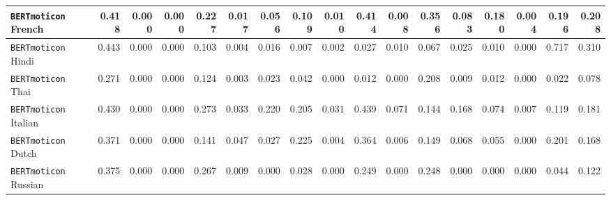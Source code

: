 \documentclass[a4paper, 11pt]{standalone}
\begin{document}
{\begin{tabular}{ l|r r r r r r r r r r r r r r r|r }
 \\
 \hline
\texttt{BERTmoticon}  French &
0.418 &
0.000 &
0.000 &
0.227 &
0.017 &
0.056 &
0.109 &
0.010 &
0.414 &
0.008 &
0.356 &
0.083 &
0.180 &
0.004 &
0.196 &
0.208
 \\
 \hline
\texttt{BERTmoticon}  Hindi &
0.443 &
0.000 &
0.000 &
0.103 &
0.004 &
0.016 &
0.007 &
0.002 &
0.027 &
0.010 &
0.067 &
0.025 &
0.010 &
0.000 &
0.717 &
0.310
 \\
 \hline
\texttt{BERTmoticon}  Thai &
0.271 &
0.000 &
0.000 &
0.124 &
0.003 &
0.023 &
0.042 &
0.000 &
0.012 &
0.000 &
0.208 &
0.009 &
0.012 &
0.000 &
0.022 &
0.078
 \\
 \hline
\texttt{BERTmoticon}  Italian &
0.430 &
0.000 &
0.000 &
0.273 &
0.033 &
0.220 &
0.205 &
0.031 &
0.439 &
0.071 &
0.144 &
0.168 &
0.074 &
0.007 &
0.119 &
0.181
 \\
 \hline
\texttt{BERTmoticon}   Dutch &
0.371 &
0.000 &
0.000 &
0.141 &
0.047 &
0.027 &
0.225 &
0.004 &
0.364 &
0.006 &
0.149 &
0.068 &
0.055 &
0.000 &
0.201 &
0.168
 \\
 \hline
\texttt{BERTmoticon} Russian &
0.375 &
0.000 &
0.000 &
0.267 &
0.009 &
0.000 &
0.028 &
0.000 &
0.249 &
0.000 &
0.248 &
0.000 &
0.000 &
0.000 &
0.044 &
0.122 
 \\
\end{tabular}}
\end{document}
